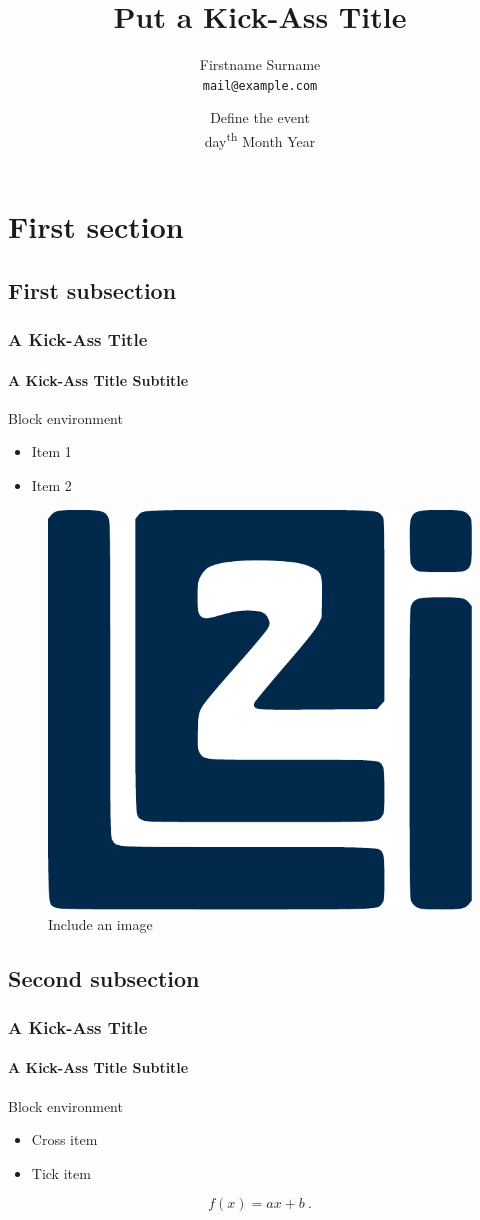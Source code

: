 \documentclass{beamer}
\title{Put a Kick-Ass Title}
\author{Firstname Surname \\ \texttt{mail@example.com}}
\date{Define the event \\ day\textsuperscript{th} Month Year}
\institute{Universit\'e de Bourgogne}
\newcommand{\tick}{\color{green!60!black!80}\ding{51}}
\newcommand{\cross}{\color{red!60!black!80}\ding{55}}
\begin{document}
\begin{frame}
  \titlepage
\end{frame}

\begin{frame}
  \tableofcontents[sectionstyle=show,subsectionstyle=show,subsubsectionstyle=hide]
\end{frame}

\section{First section}

\subsection{First subsection}

\begin{frame}
  \frametitle{A Kick-Ass Title}
  \framesubtitle{A Kick-Ass Title Subtitle}
  \begin{block}{Block environment}
    \begin{itemize}
    \item Item 1
    \item Item 2
    \end{itemize}
  \end{block}
  \begin{figure}
    \centering
    \includegraphics[width=.2\textwidth]{./images/logos/le2i-logo.pdf}
    \caption{Include an image}
  \end{figure}
\end{frame}

\subsection{Second subsection}

\begin{frame}
  \frametitle{A Kick-Ass Title}
  \framesubtitle{A Kick-Ass Title Subtitle}
  \begin{block}{Block environment}
    \begin{itemize}
    \item[\cross] Cross item
    \item[\tick] Tick item
    \end{itemize}
  \end{block}
  \begin{equation}
    \label{eq:eq1}
    f(x)=ax+b \ .
  \end{equation}
\end{frame}
\end{document}
